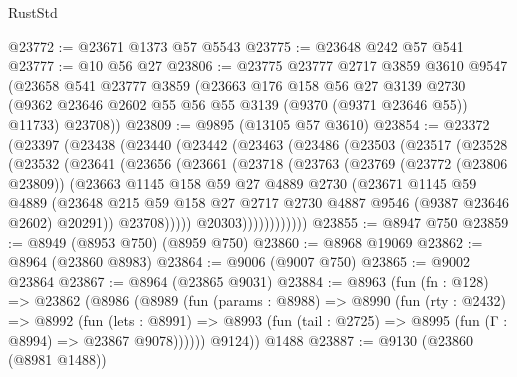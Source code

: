 \begin{lexlean}{RustStd}
\begin{coremodule}
@23772 := @23671 @1373 @57 @5543
@23775 := @23648 @242 @57 @541
@23777 := @10 @56 @27
@23806 := @23775
    @23777
    @2717
    @3859
    @3610
    @9547
    (@23658
      @541
      @23777
      @3859
      (@23663
        @176
        @158
        @56
        @27
        @3139
        @2730
        (@9362 @23646 @2602 @55 @56 @55 @3139 (@9370 (@9371 @23646 @55)) @11733)
        @23708))
@23809 := @9895 (@13105 @57 @3610)
@23854 := @23372
    (@23397
      (@23438
        (@23440
          (@23442
            (@23463
              (@23486
                (@23503
                  (@23517
                    (@23528
                      (@23532
                        (@23641
                          (@23656
                            (@23661
                              (@23718
                                (@23763
                                  (@23769
                                    (@23772 (@23806 @23809))
                                    (@23663
                                      @1145
                                      @158
                                      @59
                                      @27
                                      @4889
                                      @2730
                                      (@23671
                                        @1145
                                        @59
                                        @4889
                                        (@23648
                                          @215
                                          @59
                                          @158
                                          @27
                                          @2717
                                          @2730
                                          @4887
                                          @9546
                                          (@9387 @23646 @2602)
                                          @20291))
                                      @23708)))))
                            @20303))))))))))))
@23855 := @8947 @750
@23859 := @8949 (@8953 @750) (@8959 @750)
@23860 := @8968 @19069
@23862 := @8964 (@23860 @8983)
@23864 := @9006 (@9007 @750)
@23865 := @9002 @23864
@23867 := @8964 (@23865 @9031)
@23884 := @8963
    (fun (fn : @128) =>
    @23862
      (@8986
        (@8989
          (fun (params : @8988) =>
          @8990
            (fun (rty : @2432) =>
            @8992
              (fun (lets : @8991) =>
              @8993 (fun (tail : @2725) => @8995 (fun (Γ : @8994) => @23867 @9078))))))
        @9124))
    @1488
@23887 := @9130 (@23860 (@8981 @1488))

\end{coremodule}
\end{lexlean}

